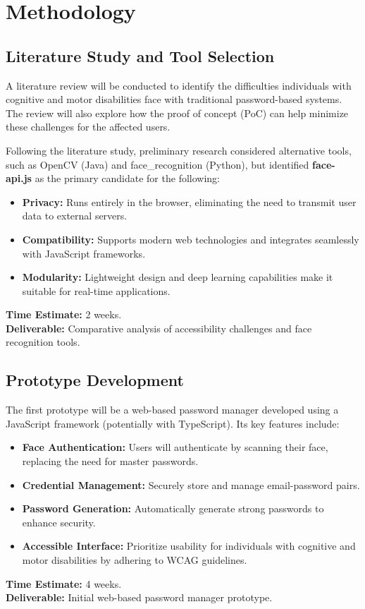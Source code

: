 \section{Methodology} 
\label{sec:methodology}

\subsection{Literature Study and Tool Selection}
A literature review will be conducted to identify the difficulties individuals with cognitive and motor disabilities face with traditional password-based systems. The review will also explore how the proof of concept (PoC) can help minimize these challenges for the affected users.

Following the literature study, preliminary research considered alternative tools, such as OpenCV (Java) and face\_recognition (Python), but identified \textbf{face-api.js} as the primary candidate for the following:
\begin{itemize}
    \item \textbf{Privacy:} Runs entirely in the browser, eliminating the need to transmit user data to external servers.
    \item \textbf{Compatibility:} Supports modern web technologies and integrates seamlessly with JavaScript frameworks.
    \item \textbf{Modularity:} Lightweight design and deep learning capabilities make it suitable for real-time applications.
\end{itemize}
\textbf{Time Estimate:} 2 weeks. \\  
\textbf{Deliverable:} Comparative analysis of accessibility challenges and face recognition tools.


\subsection{Prototype Development}
The first prototype will be a web-based password manager developed using a JavaScript framework (potentially with TypeScript). Its key features include:
\begin{itemize}
    \item \textbf{Face Authentication:} Users will authenticate by scanning their face, replacing the need for master passwords.
    \item \textbf{Credential Management:} Securely store and manage email-password pairs.
    \item \textbf{Password Generation:} Automatically generate strong passwords to enhance security.
    \item \textbf{Accessible Interface:} Prioritize usability for individuals with cognitive and motor disabilities by adhering to WCAG guidelines.
\end{itemize}
\textbf{Time Estimate:} 4 weeks. \\  
\textbf{Deliverable:} Initial web-based password manager prototype.


